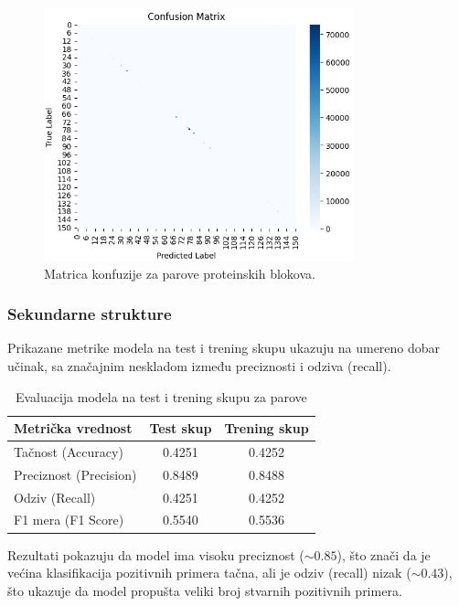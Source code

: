 \documentclass[a4paper,12pt]{article}
\begin{document}
\bigskip


\begin{figure}[htbp]
    \centering
    \includegraphics[width=0.8\textwidth]{./images/conf_mat_pb.png}
    \caption{Matrica konfuzije za parove proteinskih blokova.}
    \label{Slika:confmatpb}
\end{figure}


\subsubsection*{Sekundarne strukture}

Prikazane metrike modela na test i trening skupu ukazuju na umereno dobar učinak, sa značajnim neskladom između preciznosti i odziva (recall).

\begin{table}[h!]
\centering
\caption{Evaluacija modela na test i trening skupu za parove }
\begin{tabular}{l|cc}
\textbf{Metrička vrednost} & \textbf{Test skup} & \textbf{Trening skup} \\
\hline
Tačnost (Accuracy)     & 0.4251 & 0.4252 \\
Preciznost (Precision) & 0.8489 & 0.8488 \\
Odziv (Recall)         & 0.4251 & 0.4252 \\
F1 mera (F1 Score)     & 0.5540 & 0.5536 \\
\end{tabular}
\end{table}

\bigskip

Rezultati pokazuju da model ima visoku preciznost ($\sim0.85$), što znači da je većina klasifikacija pozitivnih primera tačna, ali je odziv (recall) nizak ($\sim0.43$), što ukazuje da model propušta veliki broj stvarnih pozitivnih primera.
\end{document}
